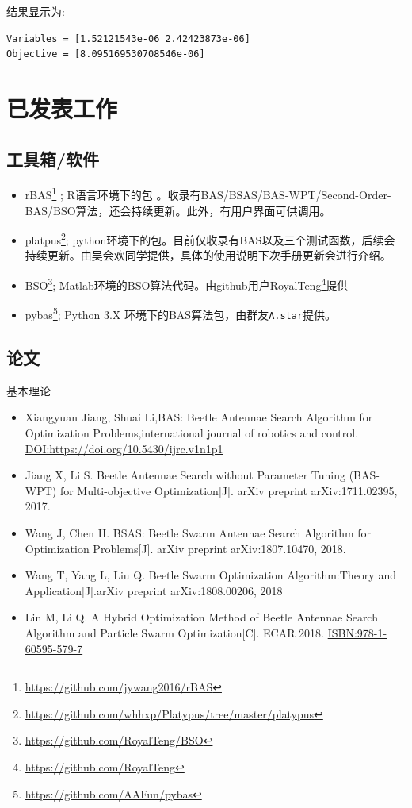\documentclass[]{ctexbook}
\providecommand{\tightlist}{%
  \setlength{\itemsep}{0pt}\setlength{\parskip}{0pt}}
\renewcommand{\href}[2]{#2\footnote{\url{#1}}}
\begin{document}
结果显示为:

\begin{verbatim}
Variables = [1.52121543e-06 2.42423873e-06]
Objective = [8.095169530708546e-06]
\end{verbatim}

\chapter{已发表工作}\label{paper}

\section{工具箱/软件}

\begin{itemize}
\item
  \href{https://github.com/jywang2016/rBAS}{rBAS} ; R语言环境下的包
  。收录有BAS/BSAS/BAS-WPT/Second-Order-BAS/BSO算法，还会持续更新。此外，有用户界面可供调用。
\item
  \href{https://github.com/whhxp/Platypus/tree/master/platypus}{platpus};
  python环境下的包。目前仅收录有BAS以及三个测试函数，后续会持续更新。由吴会欢同学提供，具体的使用说明下次手册更新会进行介绍。
\item
  \href{https://github.com/RoyalTeng/BSO}{BSO};
  Matlab环境的BSO算法代码。由github用户\href{https://github.com/RoyalTeng}{RoyalTeng}提供
\item
  \href{https://github.com/AAFun/pybas}{pybas}; Python 3.X
  环境下的BAS算法包，由群友\texttt{A.star}提供。
\end{itemize}

\section{论文}

基本理论

\begin{itemize}
\tightlist
\item
  Xiangyuan Jiang, Shuai Li,BAS: Beetle Antennae Search Algorithm for
  Optimization Problems,international journal of robotics and control.
  \url{DOI:https://doi.org/10.5430/ijrc.v1n1p1}
\item
  Jiang X, Li S. Beetle Antennae Search without Parameter Tuning
  (BAS-WPT) for Multi-objective Optimization{[}J{]}. arXiv preprint
  arXiv:1711.02395, 2017.
\item
  Wang J, Chen H. BSAS: Beetle Swarm Antennae Search Algorithm for
  Optimization Problems{[}J{]}. arXiv preprint arXiv:1807.10470, 2018.
\item
  Wang T, Yang L, Liu Q. Beetle Swarm Optimization Algorithm:Theory and
  Application{[}J{]}.arXiv preprint arXiv:1808.00206, 2018
\item
  Lin M, Li Q. A Hybrid Optimization Method of Beetle Antennae Search
  Algorithm and Particle Swarm Optimization{[}C{]}. ECAR 2018.
  \url{ISBN:978-1-60595-579-7}
\end{itemize}
\end{document}
